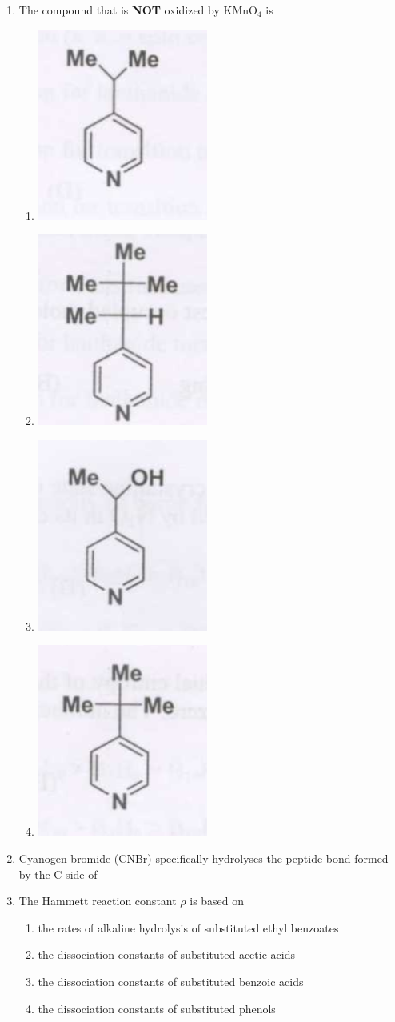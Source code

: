 \documentclass[12pt]{article}
\begin{document}
\begin{enumerate}
    

   \item  The compound that is \textbf{NOT} oxidized by KMnO$_4$ is
\begin{enumerate}
     \item \includegraphics[width=0.1\columnwidth]{figs/q12 a.png}
     \item \includegraphics[width=0.1\columnwidth]{figs/q12 b.png}
     \item \includegraphics[width=0.1\columnwidth]{figs/q12 c.png}
     \item \includegraphics[width=0.1\columnwidth]{figs/q12 d.png}
\end{enumerate}
   \hfill{}


   \item  Cyanogen bromide (CNBr) specifically hydrolyses the peptide bond formed by the C-side of
   \begin{enumerate}
\end{enumerate}

    

    \item The Hammett reaction constant $\rho$ is based on
    \begin{enumerate}
    \item  the rates of alkaline hydrolysis of substituted ethyl benzoates
    \item  the dissociation constants of substituted acetic acids
    \item  the dissociation constants of substituted benzoic acids
    \item  the dissociation constants of substituted phenols    \hfill{}
    \end{enumerate}



\end{enumerate}
\end{document}
